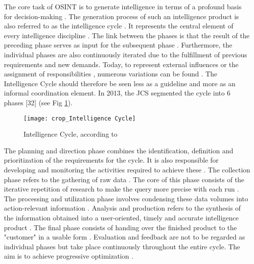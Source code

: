 \documentclass[10pt]{article}
\begin{document}
The core task of OSINT is to generate intelligence \cite{Hwang.2022,Dokman.2020}
in terms of a profound basis for decision-making
\cite{Breakspear.2013,May.2020}. The generation process of such an intelligence product
is also referred to as the intelligence cycle \cite{HerreraCubides.2020, CentralIntelligenceAgency.1987}.
It represents the central element of every intelligence discipline \cite{Reuser.2017,Dokman.2020}. The link between the phases is that
the result of the preceding phase serves as input for the subsequent phase
\cite{JointChiefsofStaffU.S.Army.2013,Pellissier.2013}. Furthermore, the individual phases are also continuously
iterated due to the fulfillment of previous requirements and new demands\cite{Gibson.2016}.
Today, to represent external influences or the
assignment of responsibilities \cite{Lowenthal.2020,Phythian.2013,Johnston.2005}, numerous
variations can be found \cite{Bohm.2021,Reuser.2017}. The
Intelligence Cycle should therefore be seen less as a guideline and more as an informal
coordination element\cite{Hwang.2022}.
In 2013, the JCS segmented the cycle into 6 phases [32] (see Fig \ref{fig: intelligence cycle}).

\begin{figure}[h]
    \centering
    \texttt{[image: crop\_Intelligence Cycle]}
    \caption{Intelligence Cycle, according to \cite{JointChiefsofStaffU.S.Army.2013}}
    \label{fig: intelligence cycle}
\end{figure}

The planning and direction phase combines the identification, definition and prioritization
of the requirements for the cycle. It is also responsible for developing and monitoring the activities
required to achieve these \cite{DepartmentoftheArmy.2012, JointChiefsofStaffU.S.Army.2013, DepartmentoftheArmy.2012}.
The collection phase refers to the gathering of raw data \cite{CentralIntelligenceAgency.1987}.
The core of this phase consists of the iterative repetition of research
\cite{NorthAtlanticTreatyOrganization.2001} to make the query more precise with each run
\cite{PastorGalindo.2020}. The processing and utilization phase involves condensing
these data volumes into action-relevant information
\cite{DirectorofNationalIntelligence.2011, JointChiefsofStaffU.S.Army.2013, PastorGalindo.2020}.
Analysis and production refers to the synthesis of the information obtained into a
user-oriented, timely and accurate intelligence product
\cite{DepartmentoftheArmy.2012, Hwang.2022, NorthAtlanticTreatyOrganization.2001}.
The final phase consists of handing over the finished product to the "customer" in a
usable form \cite{CentralIntelligenceAgency.2023, DepartmentoftheArmy.2012, Williams.2018}.
Evaluation and feedback are not to be regarded as individual phases
but take place continuously throughout the entire cycle. The aim is to achieve progressive optimization
\cite{DirectorofNationalIntelligence.2011, JointChiefsofStaffU.S.Army.2013, NorthAtlanticTreatyOrganization.2001}.
\end{document}
